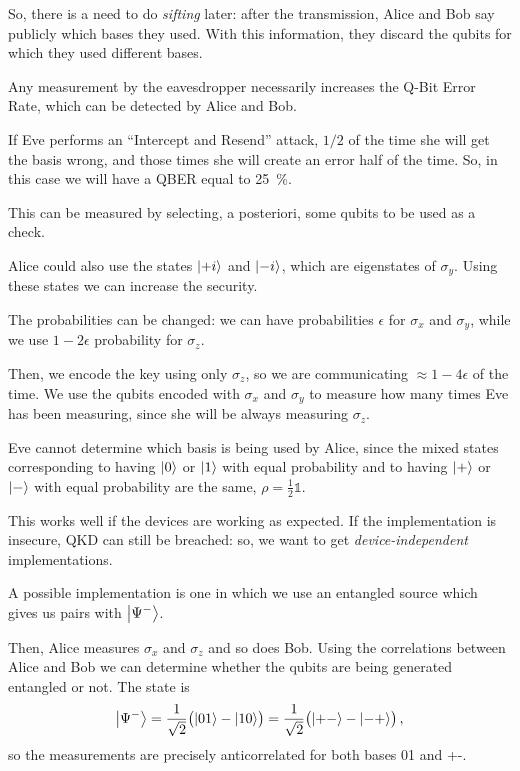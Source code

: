 \documentclass[main.tex]{subfiles}
\begin{document}
So, there is a need to do \emph{sifting} later: after the transmission, Alice and Bob say publicly which bases they used. 
With this information, they discard the qubits for which they used different bases. 

Any measurement by the eavesdropper necessarily increases the Q-Bit Error Rate, which can be detected by Alice and Bob. 

If Eve performs an ``Intercept and Resend'' attack, \(1/2\) of the time she will get the basis wrong, and those times she will create an error half of the time. 
So, in this case we will have a QBER equal to \SI{25}{\percent}. 

This can be measured by selecting, a posteriori, some qubits to be used as a check. 

Alice could also use the states \(\ket{+i}\) and \(\ket{-i}\), which are eigenstates of \(\sigma_{y}\). Using these states we can increase the security. 

The probabilities can be changed: we can have probabilities \(\epsilon \) for \(\sigma_{x}\) and \(\sigma_{y}\), while we use \(1-2\epsilon \) probability for \(\sigma_{z}\). 

Then, we encode the key using only \(\sigma_{z}\), so we are communicating \(\approx1 -4 \epsilon  \) of the time. 
We use the qubits encoded with \(\sigma_{x}\) and \(\sigma_{y}\) to measure how many times Eve has been measuring, since she will be always measuring \(\sigma_{z}\). 

Eve cannot determine which basis is being used by Alice, since the mixed states corresponding to having \(\ket{0}\) or \(\ket{1}\) with equal probability and to having \(\ket{+}\) or \(\ket{-}\) with equal probability are the same, \(\rho = \frac{1}{2} \mathbb{1}\). 

This works well if the devices are working as expected.
If the implementation is insecure, QKD can still be breached: so, we want to get \emph{device-independent} implementations. 

A possible implementation is one in which we use an entangled source which gives us pairs with \(\ket{\Psi^{-}}\). 

Then, Alice measures \(\sigma_{x}\) and \(\sigma_{z}\) and so does Bob. 
Using the correlations between Alice and Bob we can determine whether the qubits are being generated entangled or not. 
The state is 
%
\begin{align}
\ket{\Psi^{-}} = \frac{1}{\sqrt{2}} \qty(\ket{01} - \ket{10})
= \frac{1}{\sqrt{2}} \qty(\ket{+-} - \ket{- +})
\,,
\end{align}
%
so the measurements are precisely anticorrelated for both bases 01 and +-. 
\end{document}
